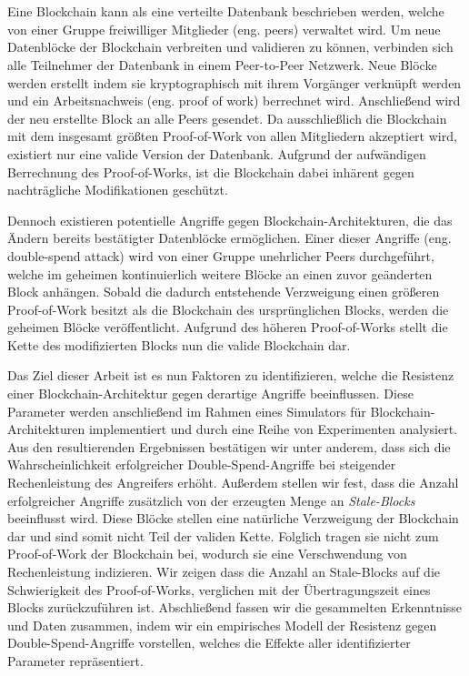 \documentclass[a4paper,12pt,twoside]{report}
\makeatletter
\renewenvironment{abstract}{%
  \if@twocolumn
    \section*{\abstractname}%
  \else
    \small
    \begin{center}%
      {\bfseries \abstractname\vspace{-.1em}\vspace{\z@}}%
    \end{center}%
    \quotation
  \fi}
  {\if@twocolumn\else\endquotation\fi}
\makeatother
\begin{document}
\clearpage

\begin{abstract}
Eine Blockchain kann als eine verteilte Datenbank beschrieben werden, welche von einer Gruppe freiwilliger Mitglieder (eng. peers) verwaltet wird. Um neue Datenblöcke der Blockchain verbreiten und validieren zu können, verbinden sich alle Teilnehmer der Datenbank in einem Peer-to-Peer Netzwerk. Neue Blöcke werden erstellt indem sie kryptographisch mit ihrem Vorgänger verknüpft werden und ein Arbeitsnachweis (eng. proof of work) berrechnet wird. Anschließend wird der neu erstellte Block an alle Peers gesendet. Da ausschließlich die Blockchain mit dem insgesamt größten Proof-of-Work von allen Mitgliedern akzeptiert wird, existiert nur eine valide Version der Datenbank. Aufgrund der aufwändigen Berrechnung des Proof-of-Works, ist die Blockchain dabei inhärent gegen nachträgliche Modifikationen geschützt.

\begin{sloppypar}
Dennoch existieren potentielle Angriffe gegen Blockchain-Architekturen, die das Ändern bereits bestätigter Datenblöcke ermöglichen. Einer dieser Angriffe (eng. double-spend attack) wird von einer Gruppe unehrlicher Peers durchgeführt, welche im geheimen kontinuierlich weitere Blöcke an einen zuvor geänderten Block anhängen. Sobald die dadurch entstehende Verzweigung einen größeren Proof-of-Work besitzt als die Blockchain des ursprüng\-lichen Blocks, werden die geheimen Blöcke veröffentlicht. Aufgrund des höher\-en Proof-of-Works stellt die Kette des modifizierten Blocks nun die valide Blockchain dar.\end{sloppypar}

Das Ziel dieser Arbeit ist es nun Faktoren zu identifizieren, welche die Resistenz einer Block\-chain-Architektur gegen derartige Angriffe beeinflussen. Diese Parameter werden anschließend im Rahmen eines Simulators für Block\-chain-Architekturen implementiert und durch eine Reihe von Experimenten analysiert. Aus den resultierenden Ergebnissen bestätigen wir unter anderem, dass sich die Wahrscheinlichkeit erfolgreicher Double-Spend-Angriffe bei steigender Rechenleistung des Angreifers erhöht. Außerdem stellen wir fest, dass die Anzahl erfolgreicher Angriffe zusätzlich von der erzeugten Menge an \textit{Stale-Blocks} beeinflusst wird. Diese Blöcke stellen eine natürliche Verzweigung der Blockchain dar und sind somit nicht Teil der validen Kette. Folglich tragen sie nicht zum Proof-of-Work der Blockchain bei, wodurch sie eine Verschwendung von Rechenleistung indizieren. Wir zeigen dass die Anzahl an Stale-Blocks auf die Schwierigkeit des Proof-of-Works, verglichen mit der Übertragungszeit eines Blocks zurückzuführen ist. Abschließend fassen wir die gesammelten Erkenntnisse und Daten zusammen, indem wir ein empirisches Modell der Resistenz gegen Double-Spend-Angriffe vorstellen, welches die Effekte aller identifizierter Parameter repräsentiert.
\end{abstract}
\end{document}
